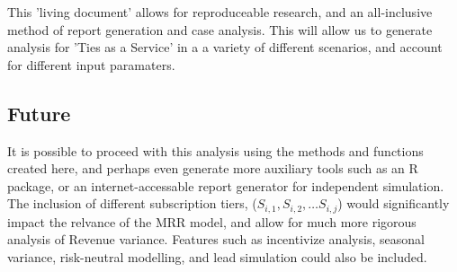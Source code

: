 \documentclass[11pt]{article}
\begin{document}
This 'living document' allows for reproduceable research, and an all-inclusive method of report generation and case analysis. This will allow us to generate analysis for 'Ties as a Service' in a a variety of different scenarios, and account for different input paramaters. 

\subsection*{Future}

It is possible to proceed with this analysis using the methods and functions created here, and perhaps even generate  more auxiliary  tools  such as an R package, or an internet-accessable report generator for independent simulation. The inclusion of different subscription tiers, ($S_{i,1}, S_{i,2}, \ldots S_{i,j}$) would significantly impact the relvance of the MRR model, and allow for much more rigorous analysis of Revenue variance. Features such as incentivize analysis, seasonal variance, risk-neutral modelling, and lead simulation could also be included.
\end{document}
